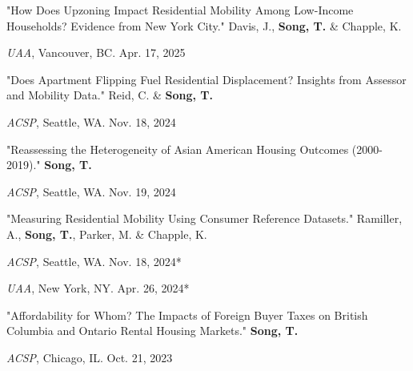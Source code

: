 \documentclass[12pt,letterpaper]{report}
\newcommand{\listitemspace}{0.4em}
\renewenvironment{itemize}
{\begin{list}{}{\setlength{\leftmargin}{0.5em}
                \setlength{\parskip}{0em}
                \setlength{\itemsep}{\listitemspace}
                \setlength{\parsep}{\listitemspace}}}
{\end{list}}
\begin{document}
\begin{itemize}
  \setlength{\itemsep}{-0.0em}  %
  
  \item "How Does Upzoning Impact Residential Mobility Among Low-Income Households? Evidence from New York City." Davis, J., \textbf{Song, T.} \& Chapple, K.
    \begin{itemize}
      \addtolength{\leftskip}{2em} 
      \setlength{\itemsep}{-0.4em}
      \item[•] \emph{UAA}, Vancouver, BC. Apr. 17, 2025
    \end{itemize}

  \item "Does Apartment Flipping Fuel Residential Displacement? Insights from Assessor and Mobility Data." Reid, C. \& \textbf{Song, T.} 
    \begin{itemize}
      \addtolength{\leftskip}{2em} 
      \setlength{\itemsep}{-0.4em}
      \item[•] \emph{ACSP}, Seattle, WA. Nov. 18, 2024
    \end{itemize}

  \item "Reassessing the Heterogeneity of Asian American Housing Outcomes (2000-2019)." \textbf{Song, T.} 
    \begin{itemize}
      \addtolength{\leftskip}{2em} 
      \setlength{\itemsep}{-0.4em}
      \item[•] \emph{ACSP}, Seattle, WA. Nov. 19, 2024
    \end{itemize}

  \item "Measuring Residential Mobility Using Consumer Reference Datasets." Ramiller, A., \textbf{Song, T.}, Parker, M. \& Chapple, K. 
  \begin{itemize}
      \addtolength{\leftskip}{2em} 
      \setlength{\itemsep}{-0.4em}
      \item[•] \emph{ACSP}, Seattle, WA. Nov. 18, 2024*
      \item[•] \emph{UAA}, New York, NY. Apr. 26, 2024*
  \end{itemize}

  \item "Affordability for Whom? The Impacts of Foreign Buyer Taxes on British Columbia and Ontario Rental Housing Markets." \textbf{Song, T.} 
  \begin{itemize}
      \addtolength{\leftskip}{2em} 
      \setlength{\itemsep}{-0.4em}
      \item[•] \emph{ACSP}, Chicago, IL. Oct. 21, 2023
  \end{itemize}


\end{itemize}
\end{document}
